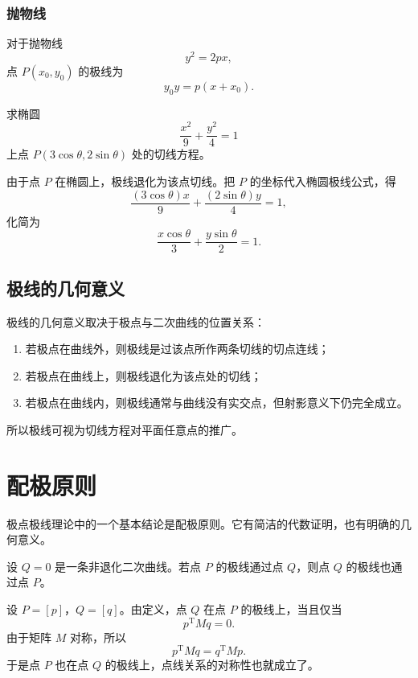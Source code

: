 \subsubsection{抛物线}
对于抛物线
\[
y^2=2px,
\]
点 $P(x_0,y_0)$ 的极线为
\[
y_0y=p(x+x_0).
\]

\begin{example}
求椭圆
\[
\frac{x^2}{9}+\frac{y^2}{4}=1
\]
上点 $P(3\cos\theta,2\sin\theta)$ 处的切线方程。
\end{example}

\begin{solution}
由于点 $P$ 在椭圆上，极线退化为该点切线。把 $P$ 的坐标代入椭圆极线公式，得
\[
\frac{(3\cos\theta)x}{9}+\frac{(2\sin\theta)y}{4}=1,
\]
化简为
\[
\frac{x\cos\theta}{3}+\frac{y\sin\theta}{2}=1.
\]
\end{solution}

\subsection{极线的几何意义}
极线的几何意义取决于极点与二次曲线的位置关系：

\begin{enumerate}
    \item 若极点在曲线外，则极线是过该点所作两条切线的切点连线；
    \item 若极点在曲线上，则极线退化为该点处的切线；
    \item 若极点在曲线内，则极线通常与曲线没有实交点，但射影意义下仍完全成立。
\end{enumerate}

所以极线可视为切线方程对平面任意点的推广。

\section{配极原则}
极点极线理论中的一个基本结论是配极原则。它有简洁的代数证明，也有明确的几何意义。

\begin{theorem}
设 $Q=0$ 是一条非退化二次曲线。若点 $P$ 的极线通过点 $Q$，则点 $Q$ 的极线也通过点 $P$。
\end{theorem}

\begin{myproof}
设 $P=[ p]$，$Q=[ q]$。由定义，点 $Q$ 在点 $P$ 的极线上，当且仅当
\[
 p^{\mathrm T}M q=0.
\]
由于矩阵 $M$ 对称，所以
\[
 p^{\mathrm T}M q= q^{\mathrm T}M p.
\]
于是点 $P$ 也在点 $Q$ 的极线上，点线关系的对称性也就成立了。
\end{myproof}

